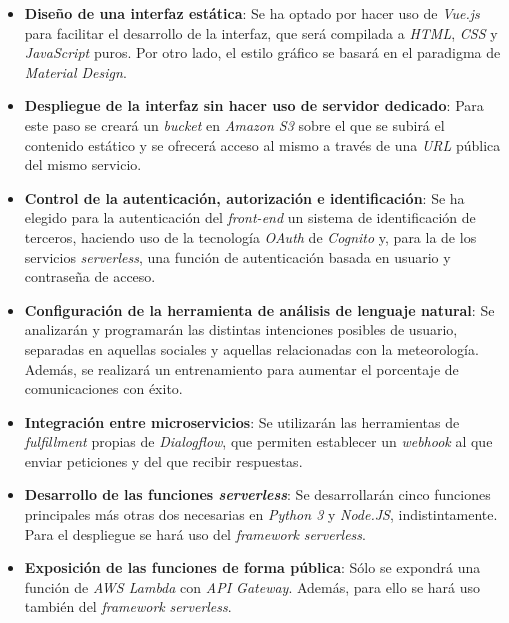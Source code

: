 \documentclass[11pt,spanish,listoffigures]{tfgetsinf}
\begin{document}
\begin{itemize}

\item \textbf{Diseño de una interfaz estática}:  Se ha optado por hacer uso de \textit{Vue.js} para facilitar el desarrollo de la interfaz, que será compilada a \textit{HTML}, \textit{CSS} y \textit{JavaScript} puros. Por otro lado, el estilo gráfico se basará en el paradigma de \textit{Material Design}. 

\item \textbf{Despliegue de la interfaz sin hacer uso de servidor dedicado}: Para este paso se creará un \textit{bucket} en \textit{Amazon S3} sobre el que se subirá el contenido estático y se ofrecerá acceso al mismo a través de una \textit{URL} pública del mismo servicio.

\item \textbf{Control de la autenticación, autorización e identificación}: Se ha elegido para la autenticación del \textit{front-end} un sistema de identificación de terceros, haciendo uso de la tecnología \textit{OAuth} de \textit{Cognito} y, para la de los servicios \textit{serverless}, una función de autenticación basada en usuario y contraseña de acceso.

\item \textbf{Configuración de la herramienta de análisis de lenguaje natural}: Se analizarán y programarán las distintas intenciones posibles de usuario, separadas en aquellas sociales y aquellas relacionadas con la meteorología. Además, se realizará un entrenamiento para aumentar el porcentaje de comunicaciones con éxito.

\item \textbf{Integración entre microservicios}: Se utilizarán las herramientas de \textit{fulfillment} propias de \textit{Dialogflow}, que permiten establecer un \textit{webhook} al que enviar peticiones y del que recibir respuestas.

\item \textbf{Desarrollo de las funciones \textit{serverless}}: Se desarrollarán cinco funciones principales más otras dos necesarias en \textit{Python 3} y \textit{Node.JS}, indistintamente. Para el despliegue se hará uso del \textit{framework} \textit{serverless}. 

\item \textbf{Exposición de las funciones de forma pública}: Sólo se expondrá una función de \textit{AWS Lambda} con \textit{API Gateway}. Además, para ello se hará uso también del \textit{framework} \textit{serverless}.

\end{itemize}
\end{document}
